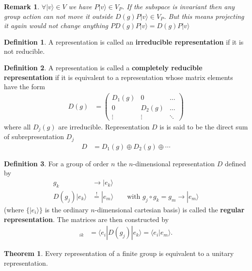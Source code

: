 \documentclass[10pt,a4paper]{book}
\newtheorem{remark}{Remark}[section]
\theoremstyle{definition}
\newtheorem{definition}{Definition}[section]
\newtheorem{theorem}{Theorem}[section]
\begin{document}
\begin{remark}{}
$\forall |v\rangle\in V$ we have $P|v\rangle\in V_P$. If the subspace is invariant then any group action can not move it outside $D(g)P|v\rangle\in V_P$. But this means projecting it again would not change anything $PD(g)P|v\rangle = D(g)P|v\rangle$
\end{remark}

\begin{definition}{}
A representation is called an {\bf irreducible representation} if it is not reducible.
\end{definition}

\begin{definition}{}
A representation is called a {\bf completely reducible representation} if it is equivalent to a representation whose matrix elements have the form
\begin{align}
D(g)&=\left(
\begin{array}{ccc}
D_1(g) & 0      & \dots \\
0      & D_2(g) & \dots \\
\vdots & \vdots & \ddots
\end{array}
\right)
\end{align}
where all $D_j(g)$ are irreducible. Representation $D$ is is said to be the direct sum of subrepresentation $D_j$
\begin{align}
D&=D_1(g)\oplus D_2(g)\oplus\dotsi
\end{align}
\end{definition}

\begin{definition}{}
For a group of order $n$ the $n$-dimensional representation $D$ defined by 
\begin{align}
g_k&\rightarrow|e_k\rangle\\
D(g_j)|e_k\rangle&\overset{!}{=}|e_m\rangle\qquad\text{with } g_j\circ g_k=g_m\rightarrow|e_m\rangle
\end{align}
(where $\{|e_i\rangle\}$ is the ordinary $n$-dimensional cartesian basis) is called the {\bf regular representation}. The matrices are then constructed by
\begin{align}
[D(g_j)]_{ik}&=\langle e_i|D(g_j)|e_k\rangle=\langle e_i|e_m\rangle.
\end{align}
\end{definition}

\begin{theorem}
Every representation of a finite group is equivalent to a unitary representation.
\end{theorem}
\end{document}
